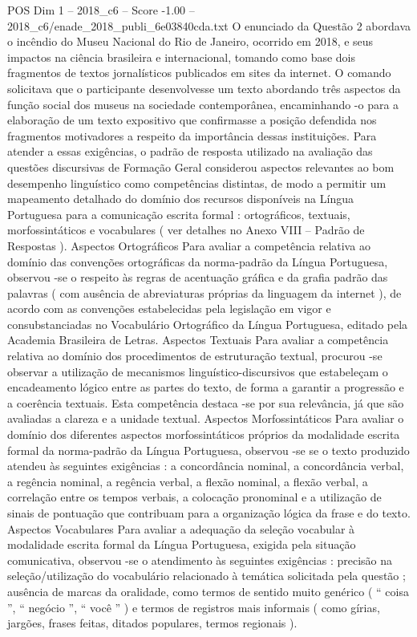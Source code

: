 \begin{textsample}{POS Dim 1 – 2018\_c6 – Score -1.00 – 2018\_c6/enade\_2018\_publi\_6e03840cda.txt}
O enunciado da Questão 2 abordava o incêndio do Museu Nacional do Rio de Janeiro, ocorrido em 2018, e seus impactos na ciência brasileira e internacional, tomando como base dois fragmentos de textos jornalísticos publicados em sites da internet.
O comando solicitava que o participante desenvolvesse um texto abordando três aspectos da função social dos museus na sociedade contemporânea, encaminhando -o para a elaboração de um texto expositivo que confirmasse a posição defendida nos fragmentos motivadores a respeito da importância dessas instituições.
Para atender a essas exigências, o padrão de resposta utilizado na avaliação das questões discursivas de Formação Geral considerou aspectos relevantes ao bom desempenho linguístico como competências distintas, de modo a permitir um mapeamento detalhado do domínio dos recursos disponíveis na Língua Portuguesa para a comunicação escrita formal : ortográficos, textuais, morfossintáticos e vocabulares ( ver detalhes no Anexo VIII – Padrão de Respostas ).
Aspectos Ortográficos Para avaliar a competência relativa ao domínio das convenções ortográficas da norma-padrão da Língua Portuguesa, observou -se o respeito às regras de acentuação gráfica e da grafia padrão das palavras ( com ausência de abreviaturas próprias da linguagem da internet ), de acordo com as convenções estabelecidas pela legislação em vigor e consubstanciadas no Vocabulário Ortográfico da Língua Portuguesa, editado pela Academia Brasileira de Letras.
Aspectos Textuais Para avaliar a competência relativa ao domínio dos procedimentos de estruturação textual, procurou -se observar a utilização de mecanismos linguístico-discursivos que estabeleçam o encadeamento lógico entre as partes do texto, de forma a garantir a progressão e a coerência textuais.
Esta competência destaca -se por sua relevância, já que são avaliadas a clareza e a unidade textual.
Aspectos Morfossintáticos Para avaliar o domínio dos diferentes aspectos morfossintáticos próprios da modalidade escrita formal da norma-padrão da Língua Portuguesa, observou -se se o texto produzido atendeu às seguintes exigências : a concordância nominal, a concordância verbal, a regência nominal, a regência verbal, a flexão nominal, a flexão verbal, a correlação entre os tempos verbais, a colocação pronominal e a utilização de sinais de pontuação que contribuam para a organização lógica da frase e do texto.
Aspectos Vocabulares Para avaliar a adequação da seleção vocabular à modalidade escrita formal da Língua Portuguesa, exigida pela situação comunicativa, observou -se o atendimento às seguintes exigências : precisão na seleção/utilização do vocabulário relacionado à temática solicitada pela questão ; ausência de marcas da oralidade, como termos de sentido muito genérico ( “ coisa ”, “ negócio ”, “ você ” ) e termos de registros mais informais ( como gírias, jargões, frases feitas, ditados populares, termos regionais ).

\end{textsample}
